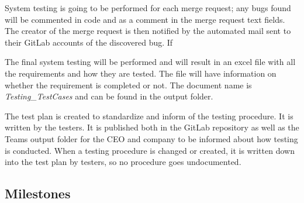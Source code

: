 \noindent System testing is going to be performed for each merge request; any bugs found will be commented in code and as a comment in the merge request text fields. The creator of the merge request is then notified by the automated mail sent to their GitLab accounts of the discovered bug. If \newline

\noindent The final system testing will be performed and will result in an excel file with all the requirements and how they are tested. The file will have information on whether the requirement is completed or not. The document name is  \textit{Testing\_TestCases} and can be found in the output folder. 
 
\noindent The test plan is created to standardize and inform of the testing procedure. It is written by the testers. It is published both in the GitLab repository as well as the Teams output folder for the CEO and company to be informed about how testing is conducted. When a testing procedure is changed or created, it is written down into the test plan by testers, so no procedure goes undocumented.

\subsection{Milestones}
